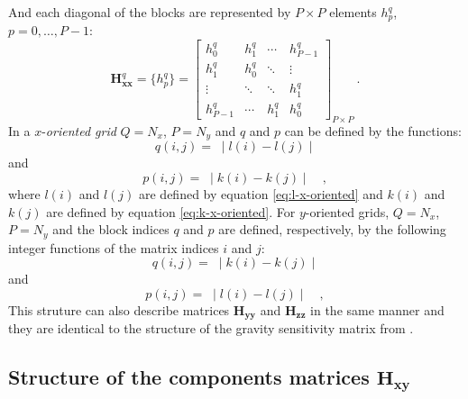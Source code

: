 And each diagonal of the blocks are represented by $P \times P$ elements $h^{q}_{p}$, $p = 0, \dots, P - 1$:
\begin{equation}
\mathbf{H}^{q}_\mathbf{xx} = \{h^{q}_p\} = \begin{bmatrix}
h^{q}_{0}   & h^{q}_{1} & \cdots    & h^{q}_{P-1} \\
h^{q}_{1}   & h^{q}_{0} & \ddots    & \vdots           \\ 
\vdots      & \ddots    & \ddots    & h^{q}_{1}   \\
h^{q}_{P-1} & \cdots    & h^{q}_{1} & h^{q}_{0}                 
\end{bmatrix}_{P \times P} \: .
\label{eq:Hxx_block}
\end{equation}
In a $x$-\textit{oriented grid} $Q = N_{x}$, $P = N_{y}$ and $q$ and $p$ can be defined by the functions:
\begin{equation}
q(i, j) = \; \mid l(i) - l(j) \mid
\label{eq:Hxx-q-x-oriented}
\end{equation}
and
\begin{equation}
p(i, j) = \; \mid k(i) - k(j) \mid \quad ,
\label{eq:Hxx-p-x-oriented}
\end{equation}
where $l(i)$ and $l(j)$ are defined by equation \ref{eq:l-x-oriented} 
and $k(i)$ and $k(j)$ are defined by equation \ref{eq:k-x-oriented}.
For $y$-oriented grids, $Q = N_{x}$, $P = N_{y}$ and the block indices
$q$ and $p$ are defined, respectively, by the following integer functions 
of the matrix indices $i$ and $j$:
\begin{equation}
q(i, j) = \; \mid k(i) - k(j) \mid 
\label{eq:Hxx-q-y-oriented}
\end{equation}
and
\begin{equation}
p(i, j) = \; \mid l(i) - l(j) \mid \quad ,
\label{eq:Hxx-p-y-oriented}
\end{equation}
This struture can also describe matrices $\mathbf{H_{yy}}$ and $\mathbf{H_{zz}}$ in the same manner and they are identical to the structure of the gravity sensitivity matrix from \cite{takahashi2020convolutional}.

\subsection{Structure of the components matrices $\mathbf{H_{xy}}$}

